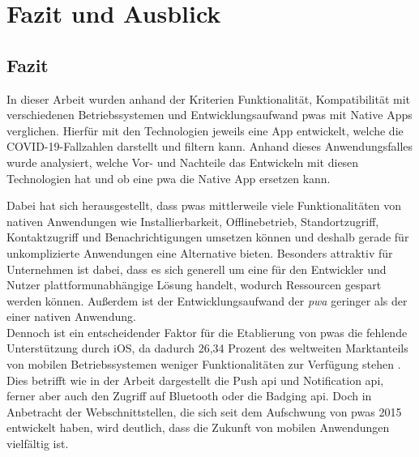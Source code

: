 \chapter{Fazit und Ausblick}\label{ch:summary}

\section{Fazit}
In dieser Arbeit wurden anhand der Kriterien Funktionalität, Kompatibilität mit verschiedenen Betriebssystemen und Entwicklungsaufwand \acp{pwa} mit Native Apps verglichen.
Hierfür mit den Technologien jeweils eine App entwickelt, welche die COVID-19-Fallzahlen darstellt und filtern kann.
Anhand dieses Anwendungsfalles wurde analysiert, welche Vor- und Nachteile das Entwickeln mit diesen Technologien hat und ob eine \ac{pwa} die Native App ersetzen kann.

Dabei hat sich herausgestellt, dass \acp{pwa} mittlerweile viele Funktionalitäten von nativen Anwendungen wie Installierbarkeit, Offlinebetrieb, Standortzugriff, Kontaktzugriff und Benachrichtigungen umsetzen können und deshalb gerade für unkomplizierte Anwendungen eine Alternative bieten.
Besonders attraktiv für Unternehmen ist dabei, dass es sich generell um eine für den Entwickler und Nutzer plattformunabhängige Lösung handelt, wodurch Ressourcen gespart werden können.
Außerdem ist der Entwicklungsaufwand der \textit{pwa} geringer als der einer nativen Anwendung.\\
Dennoch ist ein entscheidender Faktor für die Etablierung von \acp{pwa} die fehlende Unterstützung durch iOS, da dadurch 26,34 Prozent des weltweiten Marktanteils von mobilen Betriebssystemen weniger Funktionalitäten zur Verfügung stehen \cite{ODea.2021}.
Dies betrifft wie in der Arbeit dargestellt die Push \ac{api} und Notification \ac{api}, ferner aber auch den Zugriff auf Bluetooth oder die Badging \ac{api}.
Doch in Anbetracht der Webschnittstellen, die sich seit dem Aufschwung von \acp{pwa} 2015 entwickelt haben, wird deutlich, dass die Zukunft von mobilen Anwendungen vielfältig ist.

